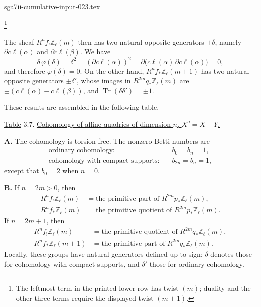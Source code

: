 \begin{filecontents*}{sga7ii-cumulative-input-023.tex}
\begin{center}
\end{center}

\footnote{The leftmost term in the printed lower row has twist $(m)$;
duality and the other three terms require the displayed twist $(m+1)$.}

The sheaf $R^nf_!\mathbb Z_\ell(m)$ then has two natural opposite
generators $\pm\delta$, namely
$\partial c\ell(\alpha)$ and $\partial c\ell(\beta)$.  We have
\begin{equation*}
\delta\,\varphi(\delta)=\delta^2
=(\partial c\ell(\alpha))^2
=\partial\bigl(c\ell(\alpha)\,\partial c\ell(\alpha)\bigr)=0,
\end{equation*}
and therefore $\varphi(\delta)=0$.  On the other hand,
$R^nf_*\mathbb Z_\ell(m+1)$ has two natural opposite generators
$\pm\delta'$, whose images in $R^{2m}q_*\mathbb Z_\ell(m)$ are
$\pm(c\ell(\alpha)-c\ell(\beta))$, and
$\operatorname{Tr}(\delta\delta')=\pm1$.


These results are assembled in the following table.

\underline{Table} 3.7. \underline{Cohomology of affine quadrics of
dimension $n$, $X^o=X-Y$.}

\medskip
\noindent\textbf{A.} The cohomology is torsion-free.  The nonzero Betti
numbers are
\begin{align*}
\text{ordinary cohomology:}\quad &b_0=b_n=1,\\
\text{cohomology with compact supports:}\quad &b_{2n}=b_n=1,
\end{align*}
except that $b_0=2$ when $n=0$.

\medskip
\noindent\textbf{B.} If $n=2m>0$, then
\begin{align*}
R^nf_!\mathbb Z_\ell(m)
  &=\text{the primitive part of }R^{2m}p_*\mathbb Z_\ell(m),\\
R^nf_*\mathbb Z_\ell(m)
  &=\text{the primitive quotient of }R^{2m}p_*\mathbb Z_\ell(m).
\end{align*}
If $n=2m+1$, then
\begin{align*}
R^nf_!\mathbb Z_\ell(m)
  &=\text{the primitive quotient of }R^{2m}q_*\mathbb Z_\ell(m),\\
R^nf_*\mathbb Z_\ell(m+1)
  &=\text{the primitive part of }R^{2m}q_*\mathbb Z_\ell(m).
\end{align*}
Locally, these groups have natural generators defined up to sign;
$\delta$ denotes those for cohomology with compact supports, and
$\delta'$ those for ordinary cohomology.


\end{filecontents*}
